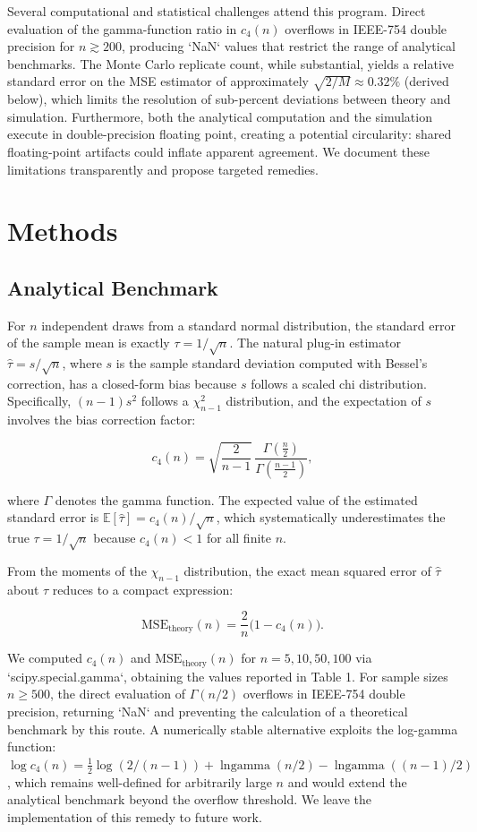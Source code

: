 \documentclass[11pt]{article}
\begin{document}
Several computational and statistical challenges attend this program. Direct evaluation of the gamma-function ratio in $c_4(n)$ overflows in IEEE-754 double precision for $n \gtrsim 200$, producing `NaN` values that restrict the range of analytical benchmarks. The Monte Carlo replicate count, while substantial, yields a relative standard error on the MSE estimator of approximately $\sqrt{2/M} \approx 0.32\%$ (derived below), which limits the resolution of sub-percent deviations between theory and simulation. Furthermore, both the analytical computation and the simulation execute in double-precision floating point, creating a potential circularity: shared floating-point artifacts could inflate apparent agreement. We document these limitations transparently and propose targeted remedies.

\section{Methods}

\subsection{Analytical Benchmark}

For $n$ independent draws from a standard normal distribution, the standard error of the sample mean is exactly $\tau = 1/\sqrt{n}$. The natural plug-in estimator $\hat{\tau} = s/\sqrt{n}$, where $s$ is the sample standard deviation computed with Bessel's correction, has a closed-form bias because $s$ follows a scaled chi distribution. Specifically, $(n-1)s^2$ follows a $\chi^2_{n-1}$ distribution, and the expectation of $s$ involves the bias correction factor:

$$c_4(n) = \sqrt{\frac{2}{n-1}}\,\frac{\Gamma\!\left(\frac{n}{2}\right)}{\Gamma\!\left(\frac{n-1}{2}\right)},$$

where $\Gamma$ denotes the gamma function. The expected value of the estimated standard error is $\mathbb{E}[\hat{\tau}] = c_4(n)/\sqrt{n}$, which systematically underestimates the true $\tau = 1/\sqrt{n}$ because $c_4(n) < 1$ for all finite $n$.

From the moments of the $\chi_{n-1}$ distribution, the exact mean squared error of $\hat{\tau}$ about $\tau$ reduces to a compact expression:

$$\mathrm{MSE}_{\mathrm{theory}}(n) = \frac{2}{n}\bigl(1 - c_4(n)\bigr).$$

We computed $c_4(n)$ and $\mathrm{MSE}_{\mathrm{theory}}(n)$ for $n = 5, 10, 50, 100$ via `scipy.special.gamma`, obtaining the values reported in Table 1. For sample sizes $n \geq 500$, the direct evaluation of $\Gamma(n/2)$ overflows in IEEE-754 double precision, returning `NaN` and preventing the calculation of a theoretical benchmark by this route. A numerically stable alternative exploits the log-gamma function: $\log c_4(n) = \frac{1}{2}\log(2/(n-1)) + \operatorname{lngamma}(n/2) - \operatorname{lngamma}((n-1)/2)$, which remains well-defined for arbitrarily large $n$ and would extend the analytical benchmark beyond the overflow threshold. We leave the implementation of this remedy to future work.
\end{document}
